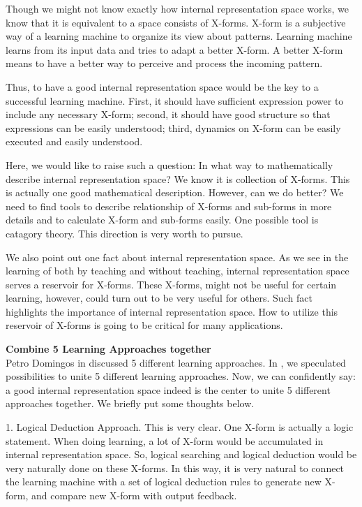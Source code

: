 Though we might not know exactly how internal representation space works, we know that it is equivalent to a space consists of X-forms. X-form is a subjective way of a learning machine to organize its view about patterns. Learning machine learns from its input data and tries to adapt a better X-form. A better X-form means to have a better way to perceive and process the incoming pattern.

Thus, to have a good internal representation space would be the key to a successful learning machine. First, it should have sufficient expression power to include any necessary X-form; second, it should have good structure so that expressions can be easily understood; third, dynamics on X-form can be easily executed and easily understood. 

Here, we would like to raise such a question: In what way to mathematically describe internal representation space? We know it is collection of X-forms. This is actually one good mathematical description. However, can we do better? We need to find tools to describe relationship of X-forms and sub-forms in more details and to calculate X-form and sub-forms easily. One possible tool is catagory theory. This direction is very worth to pursue. 

We also point out one fact about internal representation space. As we see in the learning of both by teaching and without teaching, internal representation space serves a reservoir for X-forms. These X-forms, might not be useful for certain learning, however, could turn out to be very useful for others. Such fact highlights the importance of internal representation space. How to utilize this reservoir of X-forms is going to be critical for many applications. 
\bigskip
 


{\bf Combine 5 Learning Approaches together}\\
Petro Domingos in \cite{pedro} discussed 5 different learning approaches. In \cite{paper1}, we speculated possibilities to unite 5 different learning approaches. Now, we can confidently say: a good internal representation space indeed is the center to unite 5 different approaches together. We briefly put some thoughts below.

1. Logical Deduction Approach. 
This is very clear. One X-form is actually a logic statement. When doing learning, a lot of X-form would be accumulated in internal representation space. So, logical searching and logical deduction would be very naturally done on these X-forms. In this way, it is very natural to connect the learning machine with a set of logical deduction rules to generate new X-form, and compare new X-form with output feedback.  

